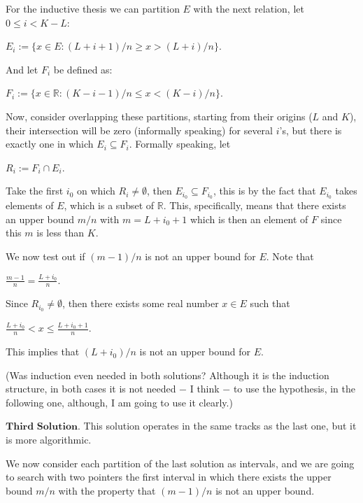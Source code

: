 \documentclass{article}
\theoremstyle{remark}
\begin{document}
\begin{enumerate}
            For the inductive thesis we can partition $E$ with the next relation, let $0 \leq i < K-L$:
            \begin{center}
                $E_i := \{x \in E: (L+i+1)/n \geq x > (L+i)/n\}$.
            \end{center}
            And let $F_i$ be defined as:
            \begin{center}
                $F_i := \{x \in \mathbb{R}: (K-i-1)/n \leq x < (K-i)/n\}$.
            \end{center}
            Now, consider overlapping these partitions, starting from their origins ($L$ and $K$), 
            their intersection will be zero (informally speaking) for several $i$'s, but there is exactly one in which
            $E_i \subseteq F_i$. Formally speaking, let
            \begin{center}
                $R_i := F_i \cap E_i$.
            \end{center}
            Take the first $i_0$ on which $R_i \neq \emptyset$, then $E_{i_0} \subseteq F_{i_0}$, this is by the fact that $E_{i_0}$ takes elements of $E$, which is a subset of $\mathbb{R}$.
            This, specifically, means that there exists an upper bound $m/n$ with $m = L+i_0+1$ which is then an element of $F$ since this $m$ is less than $K$.
            
            We now test out if $(m-1)/n$ is not an upper bound for $E$. Note that
            \begin{center}
                $\displaystyle \frac{m-1}{n} = \frac{L+i_0}{n}$.
            \end{center}
            Since $R_{i_0} \neq \emptyset$, then there exists some real number $x \in E$ such that 
            \begin{center}
                $\displaystyle \frac{L+i_0}{n} < x \leq \frac{L + i_0 + 1}{n}$.
            \end{center}
            This implies that $(L+i_0)/n$ is not an upper bound for $E$.
            
            (Was induction even needed in both solutions? Although it is the induction structure, in both cases it is not needed $-$ I think $-$ to use the hypothesis,
            in the following one, although, I am going to use it clearly.)

            $\textbf{Third Solution.}$ This solution operates in the same tracks as the last one, but it is more 
            algorithmic.

            We now consider each partition of the last solution as intervals, and we are going to search with two pointers the first interval 
            in which there exists the upper bound $m/n$ with the property that $(m-1)/n$ is not an upper bound.


\end{enumerate}
\end{document}
